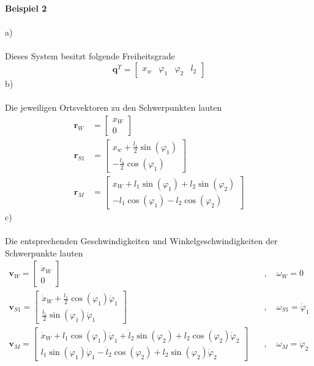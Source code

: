 \newpage
\noindent
\textbf{Beispiel 2} \\ \\
a)\\ \\
Dieses System besitzt folgende Freiheitsgrade
\[
	\textbf{q}^T = \begin{bmatrix}
		x_w & \varphi_1 & \varphi_2 & l_2
	\end{bmatrix}
\]
b)\\ \\
Die jeweiligen Ortsvektoren zu den Schwerpunkten lauten
\begin{align*}	
	\textbf{r}_W &= \begin{bmatrix}
		x_W \\
		0
	\end{bmatrix}
	\\
	\textbf{r}_{S1} &= \begin{bmatrix}
		x_w + \frac{l_1}{2}\sin(\varphi_1) \\
		-\frac{l_a}{2}\cos(\varphi_1)
	\end{bmatrix}
	\\
	\textbf{r}_M &= \begin{bmatrix}
		x_W + l_1\sin(\varphi_1) + l_2\sin(\varphi_2) \\
		-l_1\cos(\varphi_1) - l_2\cos(\varphi_2)
	\end{bmatrix}
\end{align*}
c)\\ \\
Die entsprechenden Geschwindigkeiten und Winkelgeschwindigkeiten der Schwerpunkte lauten
\begin{align*}
	\textbf{v}_W = \begin{bmatrix}
		\dot{x}_W \\
		0
	\end{bmatrix}
	\quad&,\quad
	\omega_W = 0
	\\
	\textbf{v}_{S1} = \begin{bmatrix}
		\dot{x}_W  +\frac{l_1}{2}\cos(\varphi_1)\dot{\varphi}_1 \\
		\frac{l_1}{2}\sin(\varphi_1)\dot{\varphi}_1
	\end{bmatrix}
	\quad&,\quad
	\omega_{S1} = \dot{\varphi}_1
	\\
	\textbf{v}_M = \begin{bmatrix}
		\dot{x}_W + l_1\cos(\varphi_1)\dot{\varphi}_1 + \dot{l}_2\sin(\varphi_2) + l_2\cos(\varphi_2)\dot{\varphi}_2 \\
		l_1\sin(\varphi_1)\dot{\varphi}_1 - \dot{l}_2\cos(\varphi_2) + l_2\sin(\varphi_2)\dot{\varphi}_2
	\end{bmatrix}
	\quad&,\quad
	\omega_M = \dot{\varphi}_2
\end{align*}
